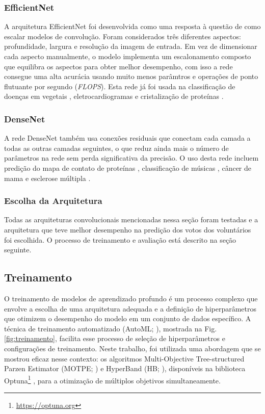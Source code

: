 \subsubsection{EfficientNet}
\label{sec:efficientnet}
A arquitetura EfficientNet \citep{EfficientNet} foi desenvolvida como uma resposta à questão de como escalar modelos de convolução. Foram considerados três diferentes aspectos: profundidade, largura e resolução da imagem de entrada. Em vez de dimensionar cada aspecto manualmente, o modelo implementa um escalonamento composto que equilibra os aspectos para obter melhor desempenho, com isso a rede consegue uma alta acurácia usando muito menos parâmtros e operações de ponto flutuante por segundo (\emph{FLOPS}). Esta rede já foi usada na classificação de doenças em vegetais \citep{EfficientNetEx03}, eletrocardiogramas \citep{EfficientNetEx01} e cristalização de proteínas \citep{EfficientNetEx02}.

\subsubsection{DenseNet}
\label{sec:densenet}
A rede DenseNet \citep{DenseNet} também usa conexões residuais que conectam cada camada a todas as outras camadas seguintes, o que reduz ainda mais o número de parâmetros na rede sem perda significativa da precisão. O uso desta rede incluem predição do mapa de contato de proteínas \citep{DenseNetEx02}, classificação de músicas \citep{DenseNetEx05}, câncer de mama \citep{DenseNetEx01} e esclerose múltipla \citep{DenseNetEx03}.


\subsubsection{Escolha da Arquitetura}
\label{sec:escolha-arch}
Todas as arquiteturas convolucionais mencionadas nessa seção foram testadas e a arquitetura que teve melhor desempenho na predição dos votos dos voluntários foi escolhida. O processo de treinamento e avaliação está descrito na seção seguinte.



\subsection{Treinamento}
\label{sec:modelo-treinamento}

O treinamento de modelos de aprendizado profundo é um processo complexo que envolve a escolha de uma arquitetura adequada e a definição de hiperparâmetros que otimizem o desempenho do modelo em um conjunto de dados específico. A técnica de treinamento automatizado (AutoML; \citealp{automl}), mostrada na Fig. \ref{fig:treinamento}, facilita esse processo de seleção de hiperparâmetros e configurações de treinamento. Neste trabalho, foi utilizada uma abordagem que se mostrou eficaz nesse contexto: os algoritmos Multi-Objective Tree-structured Parzen Estimator (MOTPE; \citealp{motpe}) e HyperBand (HB; \citealp{hyperband}), disponíveis na biblioteca Optuna\footnote{\url{https://optuna.org}} \citep{optuna}, para a otimização de múltiplos objetivos simultaneamente.


